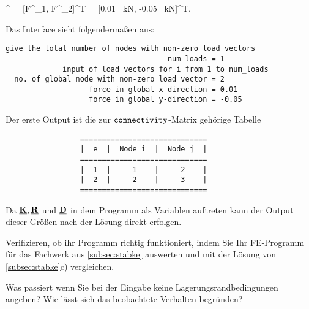\ebn
\rm
\bF^{} = [F^{}_1, F^{}_2]^T = [0.01 \, kN, -0.05 \, kN]^T.
\een

Das Interface sieht folgendermaßen aus:
{\small 
\begin{verbatim}
give the total number of nodes with non-zero load vectors
                                     num_loads = 1
             input of load vectors for i from 1 to num_loads
  no. of global node with non-zero load vector = 2
                   force in global x-direction = 0.01
                   force in global y-direction = -0.05
\end{verbatim}}

Der erste Output ist die zur $\tt connectivity$-Matrix gehörige Tabelle

 {
\small 
\begin{verbatim}
                 =============================
                 |  e  |  Node i  |  Node j  |
                 =============================
                 |  1  |     1    |     2    | 
                 |  2  |     2    |     3    | 
                 =============================
\end{verbatim}
}
Da $\underline{{\bm{\mathrm{K}}}},\underline{{\bm{\mathrm{R}}}}$ und $\underline{{\bm{\mathrm{D}}}}$ in dem Programm als Variablen auftreten kann der Output dieser Größen nach der Lösung direkt erfolgen. 

\enabres
 \item Verifizieren, ob ihr Programm richtig funktioniert, indem Sie Ihr FE-Programm für das Fachwerk aus \ref{subsec:stabke} auswerten und mit der Lösung von \ref{subsec:stabke}c) vergleichen.
\item Was passiert wenn Sie bei der Eingabe keine Lagerungsrandbedingungen angeben? 
  Wie lässt sich das beobachtete Verhalten begründen?
\enae



% 
% 
% 
